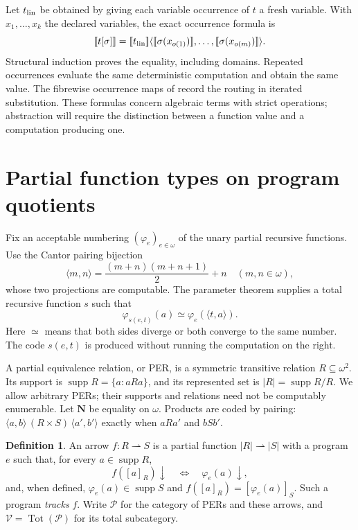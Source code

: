 \documentclass[11pt]{article}
\theoremstyle{definition}
\newtheorem{definition}[theorem]{Definition}
\newcommand{\N}{\omega}
\newcommand{\Pcat}{\mathcal P}
\newcommand{\Vcat}{\mathcal V}
\newcommand{\supp}{\operatorname{supp}}
\newcommand{\den}[1]{\mathopen{[\mkern-3mu[}#1\mathclose{]\mkern-3mu]}}
\begin{document}
Let $t_{\rm lin}$ be obtained by giving each variable occurrence of
$t$ a fresh variable. With $x_1,\ldots,x_k$ the declared variables,
the exact occurrence formula is
\begin{equation}\label{eq:linear-substitution}
 \den{t[\sigma]}
 =\den{t_{\rm lin}}
   \langle\den{\sigma(x_{o(1)})},\ldots,
           \den{\sigma(x_{o(m)})}\rangle.
\end{equation}
Structural induction proves the equality, including domains. Repeated
occurrences evaluate the same deterministic computation and obtain the
same value. The fibrewise occurrence maps of \cite{Notation} record
the routing in iterated substitution. These formulas concern algebraic
terms with strict operations; abstraction will require the distinction
between a function value and a computation producing one.

\section{Partial function types on program quotients}\label{sec:per}

Fix an acceptable numbering $(\varphi_e)_{e\in\N}$ of the unary
partial recursive functions. Use the Cantor pairing bijection
\[
 \langle m,n\rangle=\frac{(m+n)(m+n+1)}2+n
 \quad(m,n\in\N),
\]
whose two projections are computable.
The parameter theorem supplies a total recursive function $s$ such that
\begin{equation}\label{eq:smn}
 \varphi_{s(e,t)}(a)\simeq\varphi_e(\langle t,a\rangle).
\end{equation}
Here $\simeq$ means that both sides diverge or both converge to the
same number. The code $s(e,t)$ is produced without running the
computation on the right.

A partial equivalence relation, or PER, is a symmetric transitive
relation $R\subseteq\N^2$. Its support is
$\supp R=\{a:aRa\}$, and its represented set is
$|R|=\supp R/R$. We allow arbitrary PERs; their supports and
relations need not be computably enumerable. Let $\mathbf N$ be
equality on $\N$. Products are coded by pairing:
$\langle a,b\rangle\,(R\times S)\,\langle a',b'\rangle$
exactly when $aRa'$ and $bSb'$.

\begin{definition}
An arrow $f:R\rightharpoonup S$ is a partial function
$|R|\rightharpoonup|S|$ with a program $e$ such that, for every
$a\in\supp R$,
\[
 f([a]_R)\downarrow\quad\Longleftrightarrow\quad
       \varphi_e(a)\downarrow,
\]
and, when defined, $\varphi_e(a)\in\supp S$ and
$f([a]_R)=[\varphi_e(a)]_S$. Such a program \emph{tracks} $f$.
Write $\Pcat$ for the category of PERs and these arrows, and
$\Vcat=\operatorname{Tot}(\Pcat)$ for its total subcategory.
\end{definition}
\end{document}
